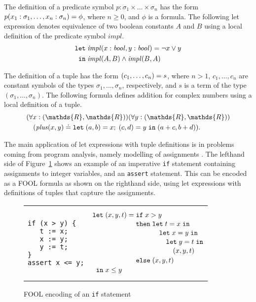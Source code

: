 \documentclass{easychair}
\begin{document}
The definition of a predicate symbol $p:\sigma_1\times\ldots\times\sigma_n$ has 
the form ${p(x_1:\sigma_1,\ldots,x_n:\sigma_n)}={\phi}$, where 
$n \geq 0$, and $\phi$ is a formula.
The following let expression denotes equivalence of two boolean constants 
$A$ and $B$ using a local definition of the predicate symbol $\mathit{impl}$.
\begin{equation}\label{eq:fool-let-impl}
\begin{aligned}
\mathtt{let}\;&{\mathit{impl}(x:\mathit{bool},y:\mathit{bool})}={\neg x \lor y}\\
 \mathtt{in}\;&\mathit{impl}(A,B)\wedge\mathit{impl}(B,A)
\end{aligned}
\end{equation}

The definition of a tuple has the form ${(c_1,\ldots,c_n)}={s}$, where
$n > 1$, $c_1,\ldots,c_n$ are constant symbols of the types
$\sigma_1,\ldots,\sigma_n$, respectively, and $s$ is a term of the type
$(\sigma_1,\ldots,\sigma_n)$. The following formula defines addition for
complex numbers using a local definition of a tuple.
\begin{equation}\label{eq:fool-tuple-let}
  \begin{aligned}
  &(\forall x:(\mathds{R},\mathds{R}))(\forall y:(\mathds{R},\mathds{R}))\\
  &\quad(\mathit{plus}(x,y)\eql \letinpar{(a,b)}{x}{(c,d)}{y}{\tuple{a+c,b+d}).}
  \end{aligned}
\end{equation}

The main application of let expressions with tuple definitions is in 
problems coming from program analysis, namely modelling of assignments
\cite{KKV18}.
The lefthand side of Figure~\ref{fig:simple-if} shows an example of an 
imperative \texttt{if} statement containing assignments to integer variables, 
and an \texttt{assert} statement. 
This can be encoded as a FOOL formula as shown on the righthand side, using 
let expressions with definitions of tuples that capture the assignments.

\begin{figure}[htbp]
\begin{center}
\begin{tabular}[t]{ll}
\begin{minipage}{0.3\textwidth}
\begin{verbatim}
if (x > y) {
   t := x;
   x := y;
   y := t;
}
assert x <= y;
\end{verbatim}
\end{minipage}
&
\begin{minipage}{0.3\textwidth}
\[
  \letnl{(x,y,t)}{\itenll{x > y}
                 {\letinnl{t}{x}
                          {\letinnl{x}{y}
                                   {\letinnl{y}{t}
                                            {(x,y,t)}}}}
                 {(x,y,t)}}
        {x \le y}
\]
\end{minipage}
\\
\end{tabular}
\end{center}
\caption{FOOL encoding of an {\tt if} statement}
\label{fig:simple-if}
\end{figure}
\end{document}
